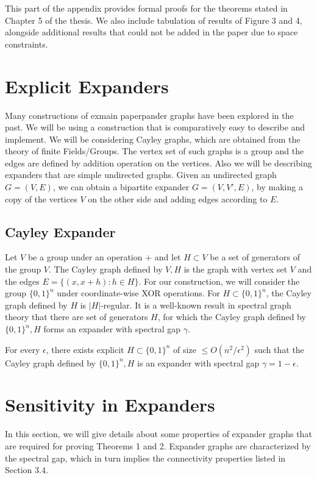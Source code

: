 
\noindent This part of the appendix provides formal proofs for the theorems stated in Chapter 5 of the thesis. We also include tabulation of results of Figure 3 and 4, alongside additional results that could not be added in the paper due to space constraints.

\section{Explicit Expanders}
\noindent  Many constructions of exmain paperpander graphs have been explored in the past. We will be using a construction that is comparatively easy to describe and implement. We will be considering Cayley graphs, which are obtained from the theory of finite Fields/Groups. The vertex set of such graphs is a group and the edges are defined by addition operation on the vertices. Also we will be describing expanders that are simple undirected graphs. Given an undirected graph $G=(V,E)$, we can obtain  a bipartite expander $G=(V,V',E)$, by making a copy of the vertices $V$ on the other side and adding edges according to $E$.

\subsection{Cayley Expander}
\noindent Let $V$ be a group under an operation $+$ and let $H \subset V$ be a set of generators of the group $V$. The Cayley graph defined by $V,H$ is the graph with vertex set $V$ and the edges $E =\{(x,x+h) : h \in H\}$. For our construction, we will consider the group $\{0,1\}^n$ under coordinate-wise XOR operations. For $H \subset \{0,1\}^n$, the Cayley graph defined by $H$ is $|H|$-regular. It is a well-known result in spectral graph theory that there are set of generators $H$, for which the Cayley graph defined by $\{0,1\}^n, H$ forms an expander with spectral gap $\gamma$.
\begin{theorem}
For every $\epsilon$,  there exists explicit $H \subset \{0,1\}^n$ of size $\leq O(n^2/\epsilon^2)$ such that the Cayley graph defined by $\{0,1\}^n, H$ is an expander with spectral gap $\gamma = 1-\epsilon$.
\end{theorem}


\section{Sensitivity in Expanders}
\noindent In this section, we will give details about some properties of expander graphs that are required for proving Theorems 1 and 2. Expander graphs are characterized by the spectral gap, which in turn implies the connectivity properties listed in Section 3.4.\\


